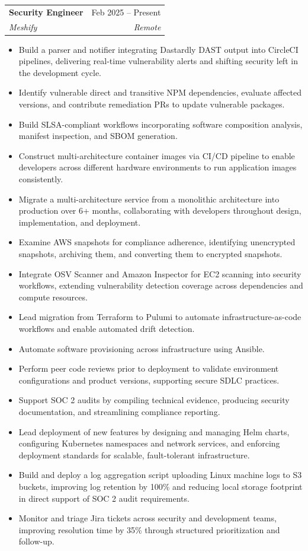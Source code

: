\documentclass[letterpaper,10pt]{article}
\makeatletter
\newcommand{\resumeItem}[1]{
  \item\small{
    {#1 \vspace{-2pt}}
  }
}
\newcommand{\resumeSubheading}[4]{
  \vspace{-2pt}\item
    \begin{tabular*}{0.97\textwidth}[t]{l@{\extracolsep{\fill}}r}
      \textbf{#1} & #2 \\
      \textit{\small#3} & \textit{\small #4} \\
    \end{tabular*}\vspace{-7pt}
}
\newcommand{\resumeItemListStart}{\begin{itemize}}
\newcommand{\resumeItemListEnd}{\end{itemize}\vspace{-5pt}}
\makeatother
\begin{document}
  \resumeSubheading
      {Security Engineer}{Feb 2025 -- Present}
      {Meshify}{Remote}
      \resumeItemListStart
        \resumeItem{Build a parser and notifier integrating Dastardly DAST output into CircleCI pipelines, delivering real-time vulnerability alerts and shifting security left in the development cycle.}
        \resumeItem{Identify vulnerable direct and transitive NPM dependencies, evaluate affected versions, and contribute remediation PRs to update vulnerable packages.}
        \resumeItem{Build SLSA-compliant workflows incorporating software composition analysis, manifest inspection, and SBOM generation.}
        \resumeItem{Construct multi-architecture container images via CI/CD pipeline to enable developers across different hardware environments to run application images consistently.}
        \resumeItem{Migrate a multi-architecture service from a monolithic architecture into production over 6+ months, collaborating with developers throughout design, implementation, and deployment.}
        \resumeItem{Examine AWS snapshots for compliance adherence, identifying unencrypted snapshots, archiving them, and converting them to encrypted snapshots.}
        \resumeItem{Integrate OSV Scanner and Amazon Inspector for EC2 scanning into security workflows, extending vulnerability detection coverage across dependencies and compute resources.}
        \resumeItem{Lead migration from Terraform to Pulumi to automate infrastructure-as-code workflows and enable automated drift detection.}
        \resumeItem{Automate software provisioning across infrastructure using Ansible.}
        \resumeItem{Perform peer code reviews prior to deployment to validate environment configurations and product versions, supporting secure SDLC practices.}
        \resumeItem{Support SOC 2 audits by compiling technical evidence, producing security documentation, and streamlining compliance reporting.}
        \resumeItem{Lead deployment of new features by designing and managing Helm charts, configuring Kubernetes namespaces and network services, and enforcing deployment standards for scalable, fault-tolerant infrastructure.}
        \resumeItem{Build and deploy a log aggregation script uploading Linux machine logs to S3 buckets, improving log retention by 100\% and reducing local storage footprint in direct support of SOC 2 audit requirements.}
        \resumeItem{Monitor and triage Jira tickets across security and development teams, improving resolution time by 35\% through structured prioritization and follow-up.}
      \resumeItemListEnd
\end{document}
